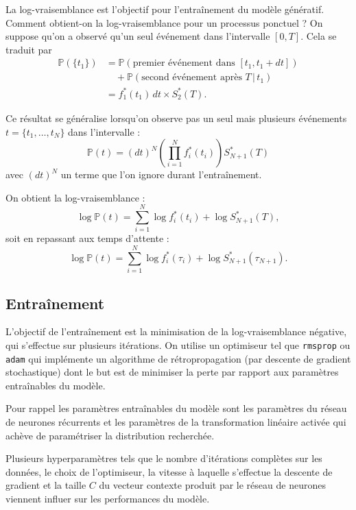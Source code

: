 \documentclass{article}
\theoremstyle{definition}
\theoremstyle{remark}
\begin{document}
La log-vraisemblance est l'objectif pour l'entraînement du modèle génératif.
Comment obtient-on la log-vraisemblance pour un processus ponctuel ?
On suppose qu'on a observé qu'un seul événement dans l'intervalle $[0, T]$.
Cela se traduit par
\begin{align*}
\mathbb{P}(\{t_1\})
& = \mathbb{P}(\text{premier événement dans } [t_1, t_1+dt]) \\
& \quad + \mathbb{P}(\text{second événement après } T \, |\,  t_1) \\
& = f^*_1(t_1)\, dt \times S^*_2(T).
\end{align*}

Ce résultat se généralise lorsqu'on observe pas un seul mais plusieurs
événements $t = \{t_1, \dots, t_N\}$ dans l'intervalle :
$$\mathbb{P}(t) = (dt)^N \left(\prod_{i=1}^N f^*_i(t_i)\right)
S^*_{N+1}(T)$$ avec $(dt)^N$ un terme que l'on ignore durant l'entraînement.

On obtient la log-vraisemblance :
$$\log \mathbb{P}(t) = \sum_{i=1}^N \log f^*_i(t_i) + \log S^*_{N+1}(T),$$
soit en repassant aux temps d'attente :
$$\log \mathbb{P}(t) = \sum_{i=1}^N \log f^*_i(\tau_i)
+ \log S^*_{N+1}(\tau_{N+1}).$$

\subsection{Entraînement}

L'objectif de l'entraînement est la minimisation de 
la log-vraisemblance négative, qui s'effectue sur plusieurs itérations.
On utilise un optimiseur tel que \verb|rmsprop| ou \verb|adam| qui implémente
un algorithme de rétropropagation (par descente de gradient stochastique)
dont le but est de minimiser la perte par rapport aux paramètres entraînables
du modèle.

Pour rappel les paramètres entraînables du modèle sont les paramètres
du réseau de neurones récurrents et les paramètres de la transformation
linéaire activée qui achève de paramétriser la distribution recherchée.

Plusieurs hyperparamètres tels que le nombre d'itérations complètes sur les
données, le choix de l'optimiseur, la vitesse à laquelle s'effectue la
descente de gradient et la taille $C$ du vecteur contexte produit par le
réseau de neurones viennent influer sur les performances du modèle.

\nocite{*}

\printbibliography
\end{document}
